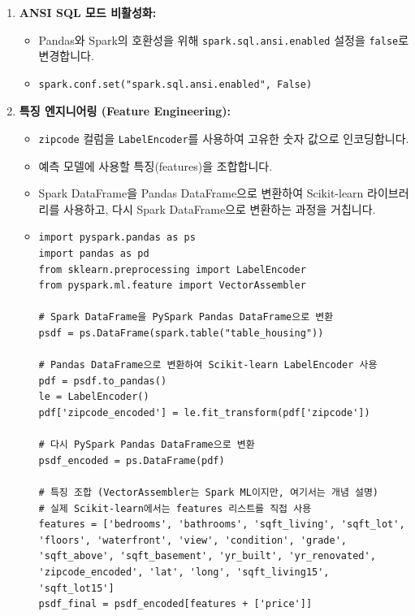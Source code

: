 \documentclass[11pt,a4paper]{article}
\theoremstyle{definition}
\newcommand{\code}[1]{\texttt{#1}}
\begin{document}
\begin{enumerate}
    \item \textbf{ANSI SQL 모드 비활성화:}
    \begin{itemize}
        \item Pandas와 Spark의 호환성을 위해 \code{spark.sql.ansi.enabled} 설정을 \code{false}로 변경합니다.
        \item 
        \begin{lstlisting}[caption=ANSI SQL 모드 설정 코드]
spark.conf.set("spark.sql.ansi.enabled", False)
        \end{lstlisting}
    \end{itemize}
    \item \textbf{특징 엔지니어링 (Feature Engineering):}
    \begin{itemize}
        \item \code{zipcode} 컬럼을 \code{LabelEncoder}를 사용하여 고유한 숫자 값으로 인코딩합니다.
        \item 예측 모델에 사용할 특징(features)을 조합합니다.
        \item Spark DataFrame을 Pandas DataFrame으로 변환하여 Scikit-learn 라이브러리를 사용하고, 다시 Spark DataFrame으로 변환하는 과정을 거칩니다.
        \item 
        \begin{lstlisting}[caption=특징 엔지니어링 코드]
import pyspark.pandas as ps
import pandas as pd
from sklearn.preprocessing import LabelEncoder
from pyspark.ml.feature import VectorAssembler

# Spark DataFrame을 PySpark Pandas DataFrame으로 변환
psdf = ps.DataFrame(spark.table("table_housing"))

# Pandas DataFrame으로 변환하여 Scikit-learn LabelEncoder 사용
pdf = psdf.to_pandas()
le = LabelEncoder()
pdf['zipcode_encoded'] = le.fit_transform(pdf['zipcode'])

# 다시 PySpark Pandas DataFrame으로 변환
psdf_encoded = ps.DataFrame(pdf)

# 특징 조합 (VectorAssembler는 Spark ML이지만, 여기서는 개념 설명)
# 실제 Scikit-learn에서는 features 리스트를 직접 사용
features = ['bedrooms', 'bathrooms', 'sqft_living', 'sqft_lot', 'floors', 'waterfront', 'view', 'condition', 'grade', 'sqft_above', 'sqft_basement', 'yr_built', 'yr_renovated', 'zipcode_encoded', 'lat', 'long', 'sqft_living15', 'sqft_lot15']
psdf_final = psdf_encoded[features + ['price']]


\end{lstlisting}
\end{itemize}
\end{enumerate}
\end{document}
